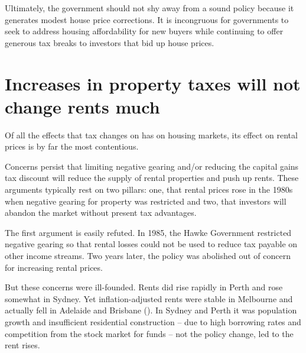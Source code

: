 \documentclass{grattan}\usepackage[]{graphicx}\usepackage[]{color}
\begin{document}
Ultimately, the government should not shy away from a sound policy because it generates modest house price corrections. It is incongruous for governments to seek to address housing affordability for new buyers while continuing to offer generous tax breaks to investors that bid up house prices.  

\section{Increases in property taxes will not change rents much}\label{sec:taxes-not-change-rents-much}














Of all the effects that tax changes on  has on housing markets, its effect on rental prices is by far the most contentious.

Concerns persist that limiting negative gearing and/or reducing the capital gains tax discount will reduce the supply of rental properties and push up rents. These arguments typically rest on two pillars: one, that rental prices rose in the 1980s when negative gearing for property was restricted and two, that investors will abandon the market without present tax advantages. 

The first argument is easily refuted. In 1985, the Hawke Government restricted negative gearing so that rental losses could not be used to reduce tax payable on other income streams.  Two years later, the policy was abolished out of concern for increasing rental prices. 

But these concerns were ill-founded. Rents did rise rapidly in Perth and rose somewhat in Sydney. Yet inflation-adjusted rents were stable in Melbourne and actually fell in Adelaide and Brisbane (). In Sydney and Perth it was population growth and insufficient residential construction -- due to high borrowing rates and competition from the stock market for funds -- not the policy change, led to the rent rises. 
\end{document}
